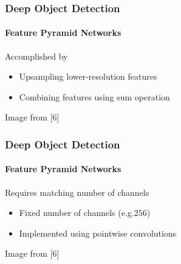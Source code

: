 \documentclass[xetex,professionalfont]{beamer}
\newcommand{\eg}{\mbox{e.g.}\xspace} %
\begin{document}
\begin{frame}
	\frametitle{Deep Object Detection}
	\framesubtitle{Feature Pyramid Networks}

	Accomplished by
	\begin{itemize}
		\item Upsampling lower-resolution features
		\item Combining features using sum operation
	\end{itemize}

	\smallskip

	\begin{center}
		{\centering Image from [6]}
	\end{center}

\end{frame}


\begin{frame}
	\frametitle{Deep Object Detection}
	\framesubtitle{Feature Pyramid Networks}

	Requires matching number of channels
	\begin{itemize}
		\item Fixed number of channels (\eg $256$)
		\item Implemented using pointwise convolutions
	\end{itemize}

	\smallskip

	\begin{center}
		{\centering Image from [6]}
	\end{center}

\end{frame}
\end{document}
